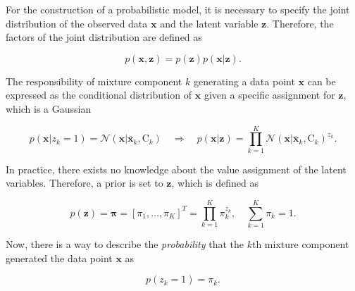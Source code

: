 For the construction of a probabilistic model, it is necessary to specify the joint distribution of the observed data $\bm{x}$ and the latent variable $\bm{z}$. Therefore, the factors of the joint distribution are defined as

\begin{equation}\label{eq:joint_lat_var}
    p(\bm{x},\bm{z}) = p(\bm{z})p(\bm{x}|\bm{z}).
\end{equation}

The responsibility of mixture component $k$ generating a data point $\bm{x}$ can be expressed as the conditional distribution of $\bm{x}$ given a specific assignment for $\bm{z}$, which is a Gaussian

\begin{equation}\label{eq:cond_lat_var}
    p(\bm{x} | z_k=1) = \mathcal{N}(\bm{x} | \overline{\bm{x}}_k, \bm{\mathrm{C}}_k) \quad \Rightarrow \quad p(\bm{x}|\bm{z}) = \prod\limits^K_{k=1}\mathcal{N}(\bm{x} | \overline{\bm{x}}_k, \bm{\mathrm{C}}_k)^{z_k} .
\end{equation}

In practice, there exists no knowledge about the value assignment of the latent variables. Therefore, a prior is set to $\bm{z}$, which is defined as

\begin{equation}\label{eq:prior_lat_var}
    p(\bm{z})=\bm{\pi}=[\pi_{1}, \dots, \pi_{K}]^T = \prod\limits^K_{k=1}\pi_k^{z_k}, \quad \sum\limits_{k=1}^K\pi_{k}=1.
\end{equation}

Now, there is a way to describe the \textit{probability} that the $k$th mixture component generated the data point $\bm{x}$ as

\begin{equation}
    p(z_k=1)=\pi_k.
\end{equation}

